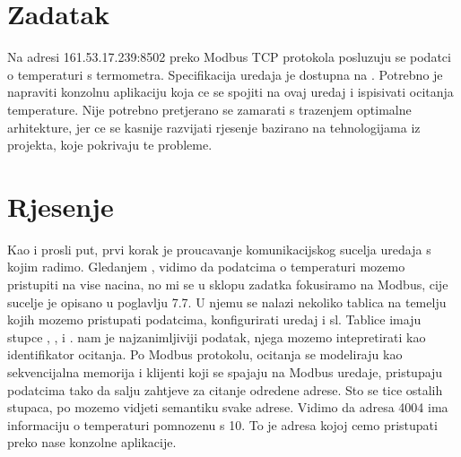 \documentclass[letterpaper,10pt,croatian]{sphinxmanual}
\begin{document}
\section{Zadatak}
\label{\detokenize{02-modbus-console/index:zadatak}}
\sphinxAtStartPar
Na adresi 161.53.17.239:8502 preko Modbus TCP protokola posluzuju se podatci o
temperaturi s termometra. Specifikacija uredaja je dostupna na .
Potrebno je napraviti konzolnu aplikaciju koja ce se spojiti na ovaj uredaj i
ispisivati ocitanja temperature. Nije potrebno pretjerano se zamarati s
trazenjem optimalne arhitekture, jer ce se kasnije razvijati rjesenje bazirano
na tehnologijama iz  projekta, koje pokrivaju te probleme.


\section{Rjesenje}
\label{\detokenize{02-modbus-console/index:rjesenje}}
\sphinxAtStartPar
Kao i prosli put, prvi korak je proucavanje komunikacijskog sucelja uredaja s
kojim radimo. Gledanjem , vidimo
da podatcima o temperaturi mozemo pristupiti na vise nacina, no mi se u sklopu
zadatka fokusiramo na Modbus, cije sucelje je opisano u poglavlju 7.7. U njemu
se nalazi nekoliko tablica na temelju kojih mozemo pristupati podatcima,
konfigurirati uredaj i sl. Tablice imaju stupce , ,  i
.  nam je najzanimljiviji podatak, njega mozemo
intepretirati kao identifikator ocitanja. Po Modbus protokolu, ocitanja se
modeliraju kao sekvencijalna memorija i klijenti koji se spajaju na Modbus
uredaje, pristupaju podatcima tako da salju zahtjeve za citanje odredene
adrese. Sto se tice ostalih stupaca, po  mozemo vidjeti semantiku
svake adrese. Vidimo da adresa 4004 ima informaciju o temperaturi pomnozenu s
10. To je adresa kojoj cemo pristupati preko nase konzolne aplikacije.
\end{document}
